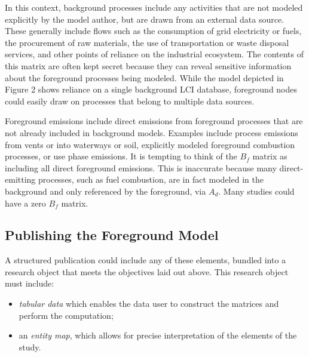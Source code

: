 In this context, background processes include any activities that are not modeled explicitly by the model author, but are drawn from an external data source.  These generally include flows such as the consumption of grid electricity or fuels, the procurement of raw materials, the use of transportation or waste disposal services, and other points of reliance on the industrial ecosystem.  The contents of this matrix are often kept secret because they can reveal sensitive information about the foreground processes being modeled.  While the model depicted in Figure 2 shows reliance on a single background LCI database, foreground nodes could easily draw on processes that belong to multiple data sources.

Foreground emissions include direct emissions from foreground processes that are not already included in background models.  Examples include process emissions from vents or into waterways or soil, explicitly modeled foreground combustion processes, or use phase emissions.  It is tempting to think of the $B_f$ matrix as including all direct foreground emissions.  This is inaccurate because many direct-emitting  processes, such as fuel combustion, are in fact modeled in the background and only referenced by the foreground, via $A_d$.  Many studies could have a zero $B_f$ matrix.

\subsection{Publishing the Foreground Model}

A structured publication could include any of these elements, bundled into a research object that meets the objectives laid out above.  This research object must include:
\begin{itemize}
\item \emph{tabular data} which enables the data user to construct the matrices and perform the computation;
\item an \emph{entity map}, which allows for precise interpretation of the elements of the study.
\end{itemize}





